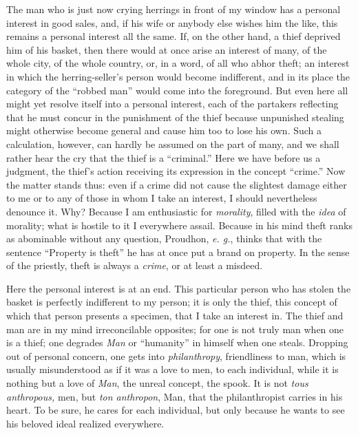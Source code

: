 \documentclass[12pt,a4paper]{book}
\begin{document}
The man who is just now crying herrings in front of my window has a personal 
interest in good sales, and, if his wife or anybody else wishes him the like, 
this remains a personal interest all the same. If, on the other hand, a thief 
deprived him of his basket, then there would at once arise an interest of 
many, of the whole city, of the whole country, or, in a word, of all who abhor 
theft; an interest in which the herring-seller's person would become 
indifferent, and in its place the category of the ``robbed man'' would come 
into the foreground. But even here all might yet resolve itself into a 
personal interest, each of the partakers reflecting that he must concur in the 
punishment of the thief because unpunished stealing might otherwise become 
general and cause him too to lose his own. Such a calculation, however, can 
hardly be assumed on the part of many, and we shall rather hear the cry that 
the thief is a ``criminal.'' Here we have before us a judgment, the thief's 
action receiving its expression in the concept ``crime.'' Now the matter 
stands thus: even if a crime did not cause the slightest damage either to me 
or to any of those in whom I take an interest, I should nevertheless denounce 
it. Why? Because I am enthusiastic for \textit{morality}, filled with the 
\textit{idea} of morality; what is hostile to it I everywhere assail. Because 
in his mind theft ranks as abominable without any question, Proudhon, 
\textit{e. g.}, thinks that with the sentence ``Property is theft'' he has 
at once put a brand on property. In the sense of the priestly, theft is always 
a \textit{crime}, or at least a misdeed.

Here the personal interest is at an end. This particular person who has stolen 
the basket is perfectly indifferent to my person; it is only the thief, this 
concept of which that person presents a specimen, that I take an interest in. 
The thief and man are in my mind irreconcilable opposites; for one is not 
truly man when one is a thief; one degrades \textit{Man} or ``humanity'' in 
himself when one steals. Dropping out of personal concern, one gets into 
\textit{philanthropy}, friendliness to man, which is usually misunderstood as 
if it was a love to men, to each individual, while it is nothing but a love of 
\textit{Man}, the unreal concept, the spook. It is not \textit{tous 
anthropous,} men, but \textit{ton anthropon}, Man, that the philanthropist 
carries in his heart. To be sure, he cares for each individual, but only 
because he wants to see his beloved ideal realized everywhere.
\end{document}
